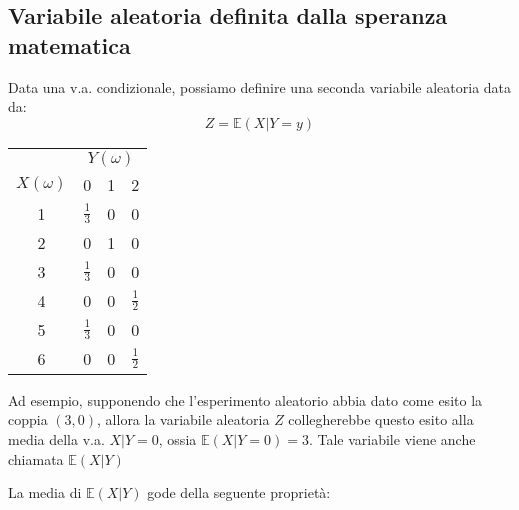 \subsection{Variabile aleatoria definita dalla speranza matematica}
Data una v.a. condizionale, possiamo definire una seconda variabile aleatoria data da:
\[
	Z = \mathbb{E} \left(X | Y = y\right)
\]
\begin{minipage}[c]{0.38\textwidth}
	\begin{tabular}{|c|ccc|}
		\hline
		            & \multicolumn{3}{c|}{$Y(\omega)$}                       \\
		$X(\omega)$ & 0                                & 1 & 2               \\
		\hline 1    & $\frac{1}{3}$                    & 0 & 0               \\
		2           & 0                                & 1 & 0               \\
		3           & $\frac{1}{3}$                    & 0 & 0               \\
		4           & 0                                & 0 & $\frac{1}{2}$   \\
		5           & $\frac{1}{3}$                    & 0 & 0               \\
		6           & 0                                & 0 & $ \frac{1}{2} $ \\
		\hline
	\end{tabular}
\end{minipage}
%
\begin{minipage}[c]{0.60\textwidth}
	Ad esempio, supponendo che l'esperimento aleatorio abbia dato come esito la coppia $ \left(3,0\right) $, allora la variabile aleatoria $ Z $ collegherebbe questo esito alla media della v.a. $ X | Y = 0 $, ossia $ \mathbb{E} \left(X | Y = 0\right) = 3 $. Tale variabile viene anche chiamata $ \mathbb{E} \left(X | Y\right) $
\end{minipage}
\vskip3mm
La media di $ \mathbb{E} \left(X | Y\right) $ gode della seguente proprietà:
